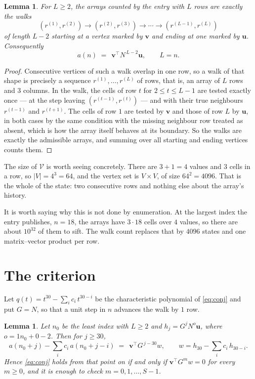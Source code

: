 \documentclass[11pt,a4paper]{article}
\theoremstyle{plain}
\newtheorem{lemma}[theorem]{Lemma}
\theoremstyle{definition}
\begin{document}
\begin{lemma}\label{lem:walk}
For $L\ge2$, the arrays counted by the entry with $L$ rows are exactly the walks
\[
(r^{(1)},r^{(2)})\to(r^{(2)},r^{(3)})\to\cdots\to(r^{(L-1)},r^{(L)})
\]
of length $L-2$ starting at a vertex marked by $\mathbf{v}$ and ending at one marked by
$\mathbf{u}$. Consequently
\[
a(n)\;=\;\,\mathbf{v}^{\!\top}N^{\,L-2}\mathbf{u},\qquad L=n .
\]
\end{lemma}

\begin{proof}
Consecutive vertices of such a walk overlap in one row, so a walk of that shape is
precisely a sequence $r^{(1)},\dots,r^{(L)}$ of rows, that is, an array of $L$ rows
and $3$ columns. In the walk, the cells of row $t$ for $2\le t\le L-1$ are tested
exactly once --- at the step leaving $(r^{(t-1)},r^{(t)})$ --- and with their true
neighbours $r^{(t-1)}$ and $r^{(t+1)}$. The cells of row $1$ are tested by
$\mathbf{v}$ and those of row $L$ by $\mathbf{u}$, in both cases by the same condition
with the missing neighbour row treated as absent, which is how the array itself behaves at
its boundary. So the walks are exactly the admissible arrays, and summing over all starting
and ending vertices counts them.
\end{proof}


The size of $\mathcal V$ is worth seeing concretely. There are $3+1=4$ values
and $3$ cells in a row, so $|V|=4^{3}=64$, and the vertex set is
$V\times V$, of size $64^2=4096$. That is the whole of the state: two consecutive
rows and nothing else about the array's history.

It is worth saying why this is not done by enumeration. At the largest index the entry
publishes, $n=18$, the arrays have $3\cdot18$ cells over
$4$ values, so there are about $10^{32}$ of them to sift. The
walk count replaces that by $4096$ states and one matrix--vector product per row.
\section{The criterion}

Let $q(t)=t^{30}-\sum_i c_i\,t^{30-i}$ be the characteristic polynomial of
\eqref{eq:conj} and put $G=N$, so that a unit step in $n$ advances the walk by
$1$ row.

\begin{lemma}\label{lem:crit}
Let $n_0$ be the least index with $L\ge2$ and $h_j=G^{j}N^{o}\mathbf{u}$, where
$o=1n_0+0-2$. Then for $j\ge30$,
\[
a(n_0+j)-\sum_i c_i\,a(n_0+j-i)\;=\;\,\mathbf{v}^{\!\top}G^{\,j-30}w,
\qquad w=h_{30}-\sum_i c_i\,h_{30-i} .
\]
Hence \eqref{eq:conj} holds from that point on if and only if
$\mathbf{v}^{\!\top}G^{m}w=0$ for every $m\ge0$, and it is enough to check
$m=0,1,\dots,S-1$.
\end{lemma}
\end{document}

